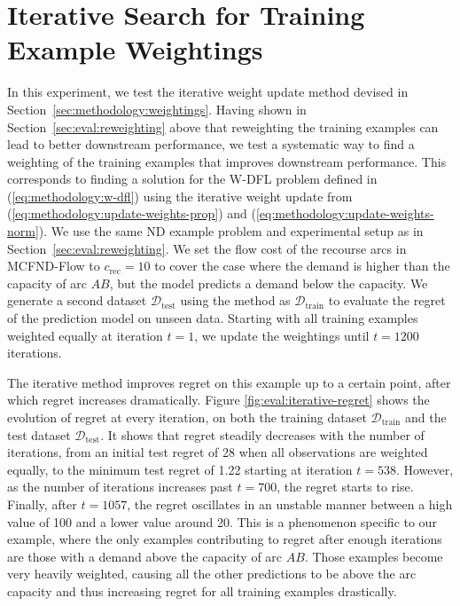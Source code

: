 \section{Iterative Search for Training Example Weightings} \label{sec:eval:iterative}

In this experiment, we test the iterative weight update method devised in Section~\ref{sec:methodology:weightings}. Having shown in Section~\ref{sec:eval:reweighting} above that reweighting the training examples can lead to better downstream performance, we test a systematic way to find a weighting of the training examples that improves downstream performance. This corresponds to finding a solution for the W-DFL problem defined in (\ref{eq:methodology:w-dfl}) using the iterative weight update from (\ref{eq:methodology:update-weights-prop}) and (\ref{eq:methodology:update-weights-norm}). We use the same ND example problem and experimental setup as in Section~\ref{sec:eval:reweighting}. We set the flow cost of the recourse arcs in MCFND-Flow to $c_\text{rec} = 10$ to cover the case where the demand is higher than the capacity of arc $AB$, but the model predicts a demand below the capacity. We generate a second dataset $\mathcal{D}_\text{test}$ using the method as $\mathcal{D}_\text{train}$ to evaluate the regret of the prediction model on unseen data. Starting with all training examples weighted equally at iteration $t=1$, we update the weightings until $t=1200$ iterations. 

The iterative method improves regret on this example up to a certain point, after which regret increases dramatically. Figure \ref{fig:eval:iterative-regret} shows the evolution of regret at every iteration, on both the training dataset $\mathcal{D}_\text{train}$ and the test dataset $\mathcal{D}_\text{test}$. It shows that regret steadily decreases with the number of iterations, from an initial test regret of 28 when all observations are weighted equally, to the minimum test regret of 1.22 starting at iteration $t=538$. However, as the number of iterations increases past $t=700$, the regret starts to rise. Finally, after $t=1057$, the regret oscillates in an unstable manner between a high value of 100 and a lower value around 20. This is a phenomenon specific to our example, where the only examples contributing to regret after enough iterations are those with a demand above the capacity of arc $AB$. Those examples become very heavily weighted, causing all the other predictions to be above the arc capacity and thus increasing regret for all training examples drastically. 

